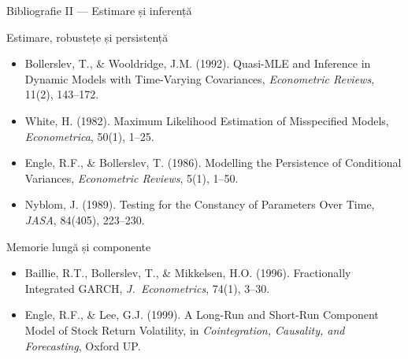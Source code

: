 \documentclass[9pt, aspectratio=169, t]{beamer}
\begin{document}
\begin{frame}{Bibliografie II --- Estimare și inferență}
    \small
    \vspace{-0.3cm}
        \begin{block}{Estimare, robustețe și persistență}
            \begin{itemize}
                \item Bollerslev, T., \& Wooldridge, J.M. (1992). Quasi-MLE and Inference in Dynamic Models with Time-Varying Covariances, \textit{Econometric Reviews}, 11(2), 143--172.
                \item White, H. (1982). Maximum Likelihood Estimation of Misspecified Models, \textit{Econometrica}, 50(1), 1--25.
                \item Engle, R.F., \& Bollerslev, T. (1986). Modelling the Persistence of Conditional Variances, \textit{Econometric Reviews}, 5(1), 1--50.
                \item Nyblom, J. (1989). Testing for the Constancy of Parameters Over Time, \textit{JASA}, 84(405), 223--230.
            \end{itemize}
        \end{block}
        \vspace{-0.15cm}
        \begin{exampleblock}{Memorie lungă și componente}
            \begin{itemize}
                \item Baillie, R.T., Bollerslev, T., \& Mikkelsen, H.O. (1996). Fractionally Integrated GARCH, \textit{J.\ Econometrics}, 74(1), 3--30.
                \item Engle, R.F., \& Lee, G.J. (1999). A Long-Run and Short-Run Component Model of Stock Return Volatility, in \textit{Cointegration, Causality, and Forecasting}, Oxford UP.
            \end{itemize}
        \end{exampleblock}
\end{frame}
\end{document}
